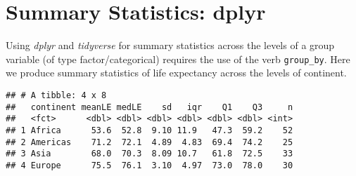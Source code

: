\documentclass[
]{book}
\newenvironment{Shaded}{\begin{snugshade}}{\end{snugshade}}
\newcommand{\CommentTok}[1]{\textcolor[rgb]{0.56,0.35,0.01}{\textit{#1}}}
\newcommand{\DataTypeTok}[1]{\textcolor[rgb]{0.13,0.29,0.53}{#1}}
\newcommand{\DecValTok}[1]{\textcolor[rgb]{0.00,0.00,0.81}{#1}}
\newcommand{\FloatTok}[1]{\textcolor[rgb]{0.00,0.00,0.81}{#1}}
\newcommand{\KeywordTok}[1]{\textcolor[rgb]{0.13,0.29,0.53}{\textbf{#1}}}
\newcommand{\NormalTok}[1]{#1}
\newcommand{\OperatorTok}[1]{\textcolor[rgb]{0.81,0.36,0.00}{\textbf{#1}}}
\newcommand{\OtherTok}[1]{\textcolor[rgb]{0.56,0.35,0.01}{#1}}
\newcommand{\StringTok}[1]{\textcolor[rgb]{0.31,0.60,0.02}{#1}}
\begin{document}
\hypertarget{summary-statistics-dplyr}{%
\section{Summary Statistics: dplyr}\label{summary-statistics-dplyr}}

Using \emph{dplyr} and \emph{tidyverse} for summary statistics across the levels of a group variable (of type factor/categorical) requires the use of the verb \texttt{group\_by}. Here we produce summary statistics of life expectancy across the levels of continent.

\begin{Shaded}
\end{Shaded}

\begin{verbatim}
## # A tibble: 4 x 8
##   continent meanLE medLE    sd   iqr    Q1    Q3     n
##   <fct>      <dbl> <dbl> <dbl> <dbl> <dbl> <dbl> <int>
## 1 Africa      53.6  52.8  9.10 11.9   47.3  59.2    52
## 2 Americas    71.2  72.1  4.89  4.83  69.4  74.2    25
## 3 Asia        68.0  70.3  8.09 10.7   61.8  72.5    33
## 4 Europe      75.5  76.1  3.10  4.97  73.0  78.0    30
\end{verbatim}
\end{document}
